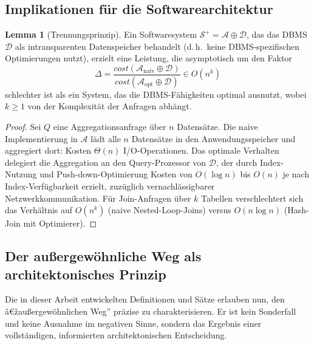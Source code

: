 ﻿\documentclass[a4paper,12pt]{article}
\theoremstyle{definition}
\newtheorem{lemma}{Lemma}
\begin{document}
\subsection{Implikationen für die Softwarearchitektur}

\begin{lemma}[Trennungsprinzip]
\label{lem:trennung}
Ein Softwaresystem $\mathcal{S}^+ = \mathcal{A} \oplus \mathcal{D}$, das das DBMS $\mathcal{D}$ als intransparenten Datenspeicher behandelt (d.\,h.\ keine DBMS-spezifischen Optimierungen nutzt), erzielt eine Leistung, die asymptotisch um den Faktor
\[
\Delta = \frac{\mathit{cost}(\mathcal{A}_{\text{naiv}} \oplus \mathcal{D})}{\mathit{cost}(\mathcal{A}_{\text{opt}} \oplus \mathcal{D})} \in O(n^k)
\]
schlechter ist als ein System, das die DBMS-Fähigkeiten optimal ausnutzt, wobei $k \geq 1$ von der Komplexität der Anfragen abhängt.
\end{lemma}

\begin{proof}
Sei $Q$ eine Aggregationsanfrage über $n$ Datensätze. Die naive Implementierung in $\mathcal{A}$ lädt alle $n$ Datensätze in den Anwendungsspeicher und aggregiert dort: Kosten $\Theta(n)$ I/O-Operationen. Das optimale Verhalten delegiert die Aggregation an den Query-Prozessor von $\mathcal{D}$, der durch Index-Nutzung und Push-down-Optimierung Kosten von $O(\log n)$ bis $O(n)$ je nach Index-Verfügbarkeit erzielt, zuzüglich vernachlässigbarer Netzwerkkommunikation. Für Join-Anfragen über $k$ Tabellen verschlechtert sich das Verhältnis auf $O(n^k)$ (naive Nested-Loop-Joins) versus $O(n \log n)$ (Hash-Join mit Optimierer).
\end{proof}

\subsection{Der außergewöhnliche Weg als architektonisches Prinzip}

Die in dieser Arbeit entwickelten Definitionen und Sätze erlauben nun, den â€žaußergewöhnlichen Weg'' präzise zu charakterisieren. Er ist kein Sonderfall und keine Ausnahme im negativen Sinne, sondern das Ergebnis einer vollständigen, informierten architektonischen Entscheidung.
\end{document}
